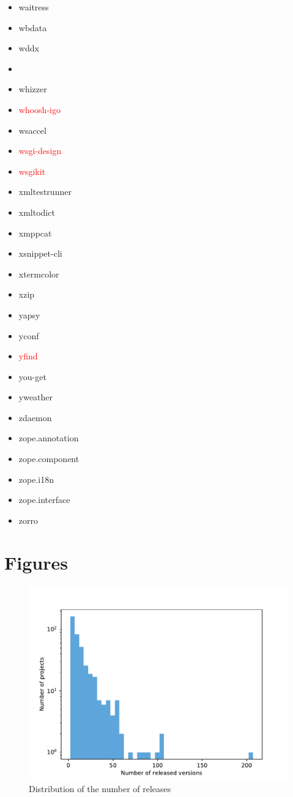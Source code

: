 \documentclass{l4proj}
\begin{document}
\begin{appendices}
{\begin{itemize}
\item waitress
\item wbdata
\item wddx
\item\textcolor{red}{}
\item whizzer
\item\textcolor{red}{whoosh-igo}
\item wsaccel
\item\textcolor{red}{wsgi-design}
\item\textcolor{red}{wsgikit}
\item xmltestrunner
\item xmltodict
\item xmppcat
\item xsnippet-cli
\item xtermcolor
\item xzip
\item yapsy
\item yconf
\item\textcolor{red}{yfind}
\item you-get
\item yweather
\item zdaemon
\item zope.annotation
\item zope.component
\item zope.i18n
\item zope.interface
\item zorro
\end{itemize}
}%

\section{Figures}

\vspace{0.2\textheight}
\begin{figure}[H]
\centering
\caption{Distribution of the number of releases}
\label{DistributionAllVersions}
\includegraphics[height=0.4\textheight]
{images/evaluation/distribution_all_versions}
\end{figure}


\end{appendices}
\end{document}
